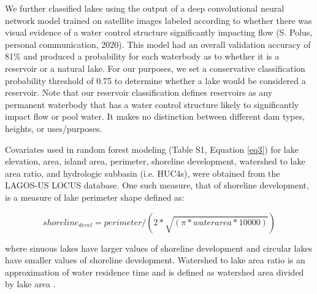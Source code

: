 \documentclass[draft]{agujournal2019}
\begin{document}
We further classified lakes using the output of a deep convolutional neural network model trained on satellite images labeled according to whether there was visual evidence of a water control structure significantly impacting flow (S. Polus, personal communication, 2020). This model had an overall validation accuracy of 81\% and produced a probability for each waterbody as to whether it is a reservoir or a natural lake. For our purposes, we set a conservative classification probability threshold of 0.75 to determine whether a lake would be considered a  reservoir. Note that our reservoir classification defines reservoirs as any permanent waterbody that has a water control structure likely to significantly impact flow or pool water. It makes no distinction between different dam types, heights, or uses/purposes.

Covariates used in random forest modeling (Table S1, Equation \ref{eq3}) for lake elevation, area, island area, perimeter, shoreline development, watershed to lake area ratio, and hydrologic subbasin (i.e. HUC4s), were obtained from the LAGOS-US LOCUS database. One such measure, that of shoreline development, is a measure of lake perimeter shape defined as:

\begin{linenomath*}
      \begin{equation}
            shoreline_{devel} = perimeter / (2 * \sqrt{(\pi * waterarea * 10000)}) \label{eq2}
      \end{equation}
      \end{linenomath*}

\noindent
where sinuous lakes have larger values of shoreline development and circular lakes have smaller values of shoreline development. Watershed to lake area ratio is an approximation of water residence time and is defined as watershed area divided by lake area \cite{timmsGeomorphologyLakeBasins2009}.
\end{document}
